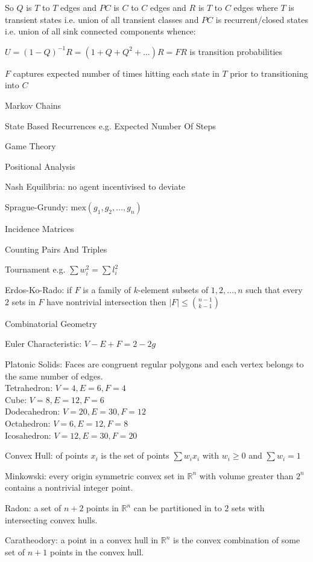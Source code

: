 So $Q$ is $T$ to $T$ edges and $PC$ is $C$ to $C$ edges and $R$ is $T$ to $C$ edges where $T$ is transient states i.e. union of all transient classes and $PC$ is recurrent/closed states i.e. union of all sink connected components whence:

$U=(1-Q)^{-1}R=(1+Q+Q^2+\dots)R=FR$ is transition probabilities

$F$ captures expected number of times hitting each state in $T$ prior to transitioning into $C$

Markov Chains

State Based Recurrences e.g. Expected Number Of Steps

Game Theory

Positional Analysis

Nash Equilibria: no agent incentivised to deviate

Sprague-Grundy: $\text{mex}({g_1,g_2,\dots,g_n})$

Incidence Matrices

Counting Pairs And Triples

Tournament e.g. $\sum w_i^2 = \sum l_i^2$

Erdos-Ko-Rado: if $F$ is a family of $k$-element subsets of ${1,2, \dots,n}$ such that every $2$ sets in $F$ have nontrivial intersection then $|F| \le \binom{n-1}{k-1}$

Combinatorial Geometry

Euler Characteristic: $V-E+F=2-2g$

Platonic Solids: Faces are congruent regular polygons and each vertex belongs to the same number of edges. \\
Tetrahedron: $V=4, E=6, F=4$ \\
Cube: $V=8, E=12, F=6$ \\
Dodecahedron: $V=20, E=30, F=12$ \\
Octahedron: $V=6, E=12, F=8$ \\
Icosahedron: $V=12, E=30, F=20$

Convex Hull: of points $x_i$ is the set of points $\sum w_i x_i$ with $w_i \ge 0$ and $\sum w_i = 1$

Minkowski: every origin symmetric convex set in $\mathbb{R}^n$ with volume greater than $2^n$ contains a nontrivial integer point.

Radon: a set of $n+2$ points in $\mathbb{R}^n$ can be partitioned in to $2$ sets with intersecting convex hulls.

Caratheodory: a point in a convex hull in $\mathbb{R}^n$ is the convex combination of some set of $n+1$ points in the convex hull.

